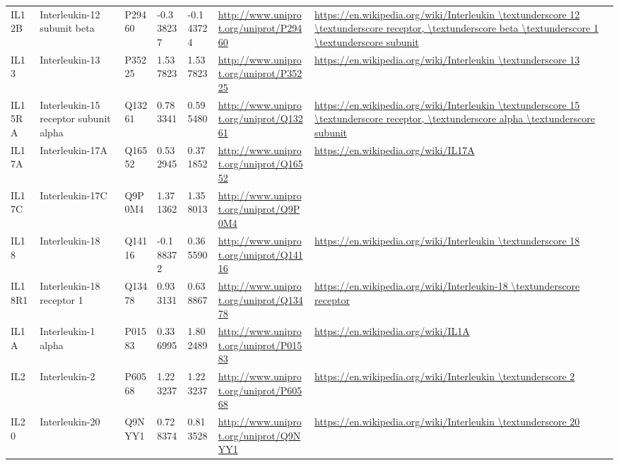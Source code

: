 \begin{table}[H]
\begin{tabular}{ lllllll }
        \multicolumn{1}{l|}{ IL12B } &  Interleukin-12 subunit beta   & P29460   & -0.338237   & -0.143724   & \url{http://www.uniprot.org/uniprot/P29460}   & \url{https://en.wikipedia.org/wiki/Interleukin \textunderscore 12 \textunderscore receptor, \textunderscore beta \textunderscore 1 \textunderscore subunit}          \\ 
        \multicolumn{1}{l|}{ IL13 } &  Interleukin-13   & P35225   & 1.537823   & 1.537823   & \url{http://www.uniprot.org/uniprot/P35225}   & \url{https://en.wikipedia.org/wiki/Interleukin \textunderscore 13}          \\ 
        \multicolumn{1}{l|}{ IL15RA } &  Interleukin-15 receptor subunit alpha   & Q13261   & 0.783341   & 0.595480   & \url{http://www.uniprot.org/uniprot/Q13261}   & \url{https://en.wikipedia.org/wiki/Interleukin \textunderscore 15 \textunderscore receptor, \textunderscore alpha \textunderscore subunit}          \\ 
        \multicolumn{1}{l|}{ IL17A } &  Interleukin-17A   & Q16552   & 0.532945   & 0.371852   & \url{http://www.uniprot.org/uniprot/Q16552}   & \url{https://en.wikipedia.org/wiki/IL17A}          \\ 
        \multicolumn{1}{l|}{ IL17C } &  Interleukin-17C   & Q9P0M4   & 1.371362   & 1.358013   & \url{http://www.uniprot.org/uniprot/Q9P0M4}   &           \\ 
        \multicolumn{1}{l|}{ IL18 } &  Interleukin-18   & Q14116   & -0.188372   & 0.365590   & \url{http://www.uniprot.org/uniprot/Q14116}   & \url{https://en.wikipedia.org/wiki/Interleukin \textunderscore 18}          \\ 
        \multicolumn{1}{l|}{ IL18R1 } &  Interleukin-18 receptor 1   & Q13478   & 0.933131   & 0.638867   & \url{http://www.uniprot.org/uniprot/Q13478}   & \url{https://en.wikipedia.org/wiki/Interleukin-18 \textunderscore receptor}          \\ 
        \multicolumn{1}{l|}{ IL1A } &  Interleukin-1 alpha   & P01583   & 0.336995   & 1.802489   & \url{http://www.uniprot.org/uniprot/P01583}   & \url{https://en.wikipedia.org/wiki/IL1A}          \\ 
        \multicolumn{1}{l|}{ IL2 } &  Interleukin-2   & P60568   & 1.223237   & 1.223237   & \url{http://www.uniprot.org/uniprot/P60568}   & \url{https://en.wikipedia.org/wiki/Interleukin \textunderscore 2}          \\ 
        \multicolumn{1}{l|}{ IL20 } &  Interleukin-20   & Q9NYY1   & 0.728374   & 0.813528   & \url{http://www.uniprot.org/uniprot/Q9NYY1}   & \url{https://en.wikipedia.org/wiki/Interleukin \textunderscore 20}          \\ 

\end{tabular}
\end{table}
